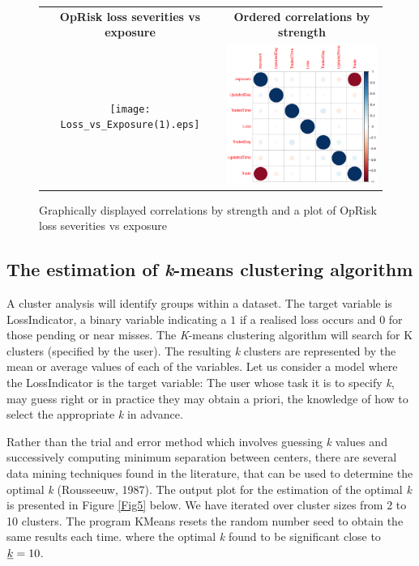 \documentclass{DissertateUSU}
\begin{document}
\begin{figure}
\begin{frame}
      \centering
       \begin{tabular}{cc}
        \textbf{OpRisk loss severities vs exposure} & \textbf{Ordered correlations by strength}\\
        \texttt{[image: Loss\_vs\_Exposure(1).eps]}
         &
         \includegraphics[width=7cm]{CorrPlot.eps}
         \end{tabular}
    \end{frame}
    \caption{Graphically displayed correlations by strength and a plot of OpRisk loss severities vs exposure}
    \label{Fig4}
\end{figure}

\subsection{The estimation of \emph{k}-means clustering algorithm}

A cluster analysis will identify groups within a dataset. The target
variable is LossIndicator, a binary variable indicating a \(1\) if a
realised loss occurs and \(0\) for those pending or near misses. The
\emph{K}-means clustering algorithm will search for K clusters
(specified by the user). The resulting \emph{k} clusters are represented
by the mean or average values of each of the variables. Let us consider
a model where the LossIndicator is the target variable: The user whose
task it is to specify \emph{k}, may guess right or in practice they may
obtain a priori, the knowledge of how to select the appropriate \emph{k}
in advance.\medskip

Rather than the trial and error method which involves guessing \emph{k}
values and successively computing minimum separation between centers,
there are several data mining techniques found in the literature, that
can be used to determine the optimal \emph{k} (Rousseeuw, 1987). The
output plot for the estimation of the optimal \emph{k} is presented in
Figure \ref{Fig5} below. We have iterated over cluster sizes from 2 to
10 clusters. The program KMeans resets the random number seed to obtain
the same results each time. where the optimal \emph{k} found to be
significant close to \(\emph{k} = 10\).\medskip
\end{document}
